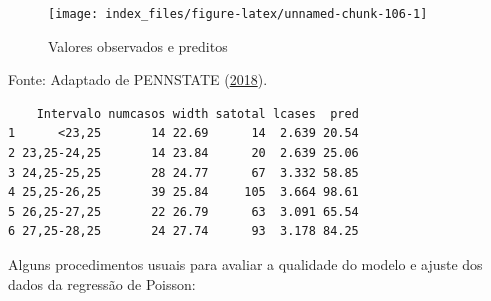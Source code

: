 \documentclass[12pt,brazil,oneside]{book}
\newenvironment{Shaded}{\begin{snugshade}}{\end{snugshade}}
\newcommand{\DataTypeTok}[1]{\textcolor[rgb]{0.13,0.29,0.53}{#1}}
\newcommand{\DecValTok}[1]{\textcolor[rgb]{0.00,0.00,0.81}{#1}}
\newcommand{\KeywordTok}[1]{\textcolor[rgb]{0.13,0.29,0.53}{\textbf{#1}}}
\newcommand{\NormalTok}[1]{#1}
\newcommand{\OperatorTok}[1]{\textcolor[rgb]{0.81,0.36,0.00}{\textbf{#1}}}
\newcommand{\StringTok}[1]{\textcolor[rgb]{0.31,0.60,0.02}{#1}}
\begin{document}
\begin{Shaded}
\end{Shaded}

\begin{figure}[H]

{\centering \texttt{[image: index\_files/figure-latex/unnamed-chunk-106-1]} 

}

\caption{Valores observados e preditos}\label{fig:unnamed-chunk-106}
\end{figure}

Fonte: Adaptado de PENNSTATE (\protect\hyperlink{ref-penn2018}{2018}).

\begin{Shaded}
\end{Shaded}

\begin{verbatim}
    Intervalo numcasos width satotal lcases  pred
1      <23,25       14 22.69      14  2.639 20.54
2 23,25-24,25       14 23.84      20  2.639 25.06
3 24,25-25,25       28 24.77      67  3.332 58.85
4 25,25-26,25       39 25.84     105  3.664 98.61
5 26,25-27,25       22 26.79      63  3.091 65.54
6 27,25-28,25       24 27.74      93  3.178 84.25
\end{verbatim}

Alguns procedimentos usuais para avaliar a qualidade do modelo e ajuste dos dados da regressão de Poisson:
\end{document}
